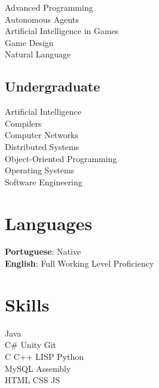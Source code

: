 \documentclass[letterpaper]{deedy-resume} %
\begin{document}
\begin{minipage}[t]{0.33\textwidth}
Advanced Programming \\
Autonomous Agents \\
Artificial Intelligence in Games \\
Game Design\\
Natural Language \\

\sectionspace %


\subsection{Undergraduate}

Artificial Intelligence\\
Compilers\\
Computer Networks\\
Distributed Systems\\
Object-Oriented Programming\\
Operating Systems\\
Software Engineering\\
\sectionspace %



\section{Languages} 
\textbf{Portuguese}: Native\\
\textbf{English}: Full Working Level Proficiency\\

\sectionspace %


\section{Skills}


Java \\
C\# \textbullet{} Unity \textbullet{} Git\\
C \textbullet{} C++ \textbullet{} LISP \textbullet{}  Python\\
MySQL \textbullet{} Assembly\\
HTML \textbullet{} CSS \textbullet{} JS\\


\sectionspace %

\end{minipage} %
\end{document}
